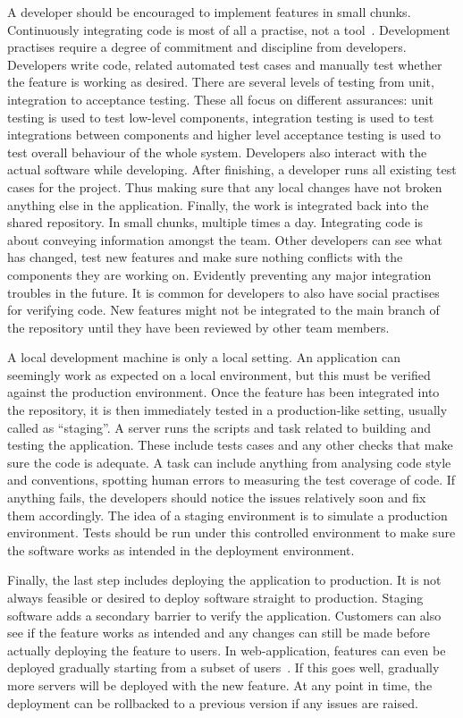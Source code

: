 \documentclass[english]{tktltiki2}
\begin{document}
A developer should be encouraged to implement features in small chunks. Continuously integrating code is most of all a practise, not a tool~\cite{HF11}. Development practises require a degree of commitment and discipline from developers. Developers write code, related automated test cases and manually test whether the feature is working as desired. There are several levels of testing from unit, integration to acceptance testing. These all focus on different assurances: unit testing is used to test low-level components, integration testing is used to test integrations between components and higher level acceptance testing is used to test overall behaviour of the whole system. Developers also interact with the actual software while developing. After finishing, a developer runs all existing test cases for the project. Thus making sure that any local changes have not broken anything else in the application. Finally, the work is integrated back into the shared repository. In small chunks, multiple times a day. Integrating code is about conveying information amongst the team. Other developers can see what has changed, test new features and make sure nothing conflicts with the components they are working on. Evidently preventing any major integration troubles in the future. It is common for developers to also have social practises for verifying code. New features might not be integrated to the main branch of the repository until they have been reviewed by other team members.

A local development machine is only a local setting. An application can seemingly work as expected on a local environment, but this must be verified against the production environment. Once the feature has been integrated into the repository, it is then immediately tested in a production-like setting, usually called as “staging”. A server runs the scripts and task related to building and testing the application. These include tests cases and any other checks that make sure the code is adequate. A task can include anything from analysing code style and conventions, spotting human errors to measuring the test coverage of code. If anything fails, the developers should notice the issues relatively soon and fix them accordingly. The idea of a staging environment is to simulate a production environment. Tests should be run under this controlled environment to make sure the software works as intended in the deployment environment.

Finally, the last step includes deploying the application to production. It is not always feasible or desired to deploy software straight to production. Staging software adds a secondary barrier to verify the application. Customers can also see if the feature works as intended and any changes can still be made before actually deploying the feature to users. In web-application, features can even be deployed gradually starting from a subset of users~\cite{Bos12}. If this goes well, gradually more servers will be deployed with the new feature. At any point in time, the deployment can be rollbacked to a previous version if any issues are raised.
\end{document}

